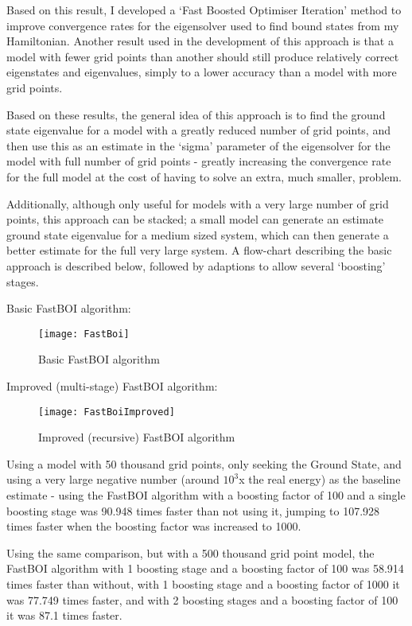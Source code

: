 Based on this result, I developed a `Fast Boosted Optimiser Iteration' method to improve convergence rates for the eigensolver used to find bound states from my Hamiltonian. Another result used in the development of this approach is that a model with fewer grid points than another should still produce relatively correct eigenstates and eigenvalues, simply to a lower accuracy than a model with more grid points. 

Based on these results, the general idea of this approach is to find the ground state eigenvalue for a model with a greatly reduced number of grid points, and then use this as an estimate in the `sigma' parameter of the eigensolver for the model with full number of grid points - greatly increasing the convergence rate for the full model at the cost of having to solve an extra, much smaller, problem. 

Additionally, although only useful for models with a very large number of grid points, this approach can be stacked; a small model can generate an estimate ground state eigenvalue for a medium sized system, which can then generate a better estimate for the full very large system. A flow-chart describing the basic approach is described below, followed by adaptions to allow several `boosting' stages.

Basic FastBOI algorithm:

\begin{figure}[!htb]
	\texttt{[image: FastBoi]}
	\centering
	\caption{Basic FastBOI algorithm}
\end{figure}

Improved (multi-stage) FastBOI algorithm:
\begin{figure}[!htb]
	\texttt{[image: FastBoiImproved]}
	\centering
	\caption{Improved (recursive) FastBOI algorithm}
\end{figure}

Using a model with 50 thousand grid points, only seeking the Ground State, and using a very large negative number (around $10^{3}$x the real energy) as the baseline estimate - using the FastBOI algorithm with a boosting factor of 100 and a single boosting stage was 90.948 times faster than not using it, jumping to 107.928 times faster when the boosting factor was increased to 1000. 

Using the same comparison, but with a 500 thousand grid point model, the FastBOI algorithm with 1 boosting stage and a boosting factor of 100 was 58.914 times faster than without, with 1 boosting stage and a boosting factor of 1000 it was 77.749 times faster, and with 2 boosting stages and a boosting factor of 100 it was 87.1 times faster. 

